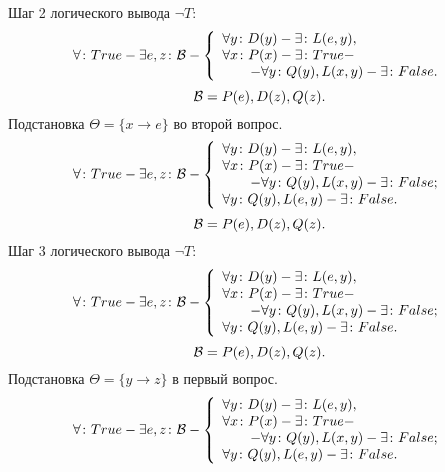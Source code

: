 \documentclass[12pt]{article}
\begin{document}
\newpage{}
\noindent{}Шаг 2 логического вывода $\neg{}T$:
$$
\forall\colon True - \exists e, z\colon {\cal{} B}- \left\{
\begin{array}{lcl}
 \forall y \colon D(y) - \exists{}\colon{} L(e,y), \\
 \forall x \colon P(x) - \exists\colon{} True - \\
 \hspace{2em} - \forall{} y \colon{} Q(y),L(x,y) - \exists{}\colon{} False.
\end{array}
\right.
$$
$$
{\cal{} B} = P(e),D(z),Q(z).
$$
Подстановка $\Theta=\{x\rightarrow{} e\}$ во второй вопрос.
$$
\forall\colon True - \exists e, z\colon {\cal{} B}- \left\{
\begin{array}{lcl}
 \forall y \colon D(y) - \exists{}\colon{} L(e,y), \\
 \forall x \colon P(x) - \exists\colon{} True - \\
 \hspace{2em} - \forall{} y \colon{} Q(y),L(x,y) - \exists{}\colon{} False;\\{}
 \forall{} y \colon{} Q(y),L(e,y) - \exists{}\colon{} False.
\end{array}
\right.
$$
$$
{\cal{} B} = P(e),D(z),Q(z).
$$
\newpage{}
\noindent{}Шаг 3 логического вывода $\neg{}T$:
$$
\forall\colon True - \exists e, z\colon {\cal{} B}- \left\{
\begin{array}{lcl}
 \forall y \colon D(y) - \exists{}\colon{} L(e,y), \\
 \forall x \colon P(x) - \exists\colon{} True - \\
 \hspace{2em} - \forall{} y \colon{} Q(y),L(x,y) - \exists{}\colon{} False;\\{}
 \forall{} y \colon{} Q(y),L(e,y) - \exists{}\colon{} False.
\end{array}
\right.
$$
$$
{\cal{} B} = P(e),D(z),Q(z).
$$
Подстановка $\Theta=\{y \rightarrow{} z\}$ в первый вопрос.
$$
\forall\colon True - \exists e, z\colon {\cal{} B}- \left\{
\begin{array}{lcl}
 \forall y \colon D(y) - \exists{}\colon{} L(e,y), \\
 \forall x \colon P(x) - \exists\colon{} True - \\
 \hspace{2em} - \forall{} y \colon{} Q(y),L(x,y) - \exists{}\colon{} False;\\{}
 \forall{} y \colon{} Q(y),L(e,y) - \exists{}\colon{} False.
\end{array}
\right.
$$
\end{document}
